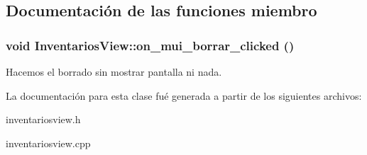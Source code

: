 \subsection{Documentaci\'{o}n de las funciones miembro}
\subsubsection{\setlength{\rightskip}{0pt plus 5cm}void Inventarios\-View::on\_\-mui\_\-borrar\_\-clicked ()\hspace{0.3cm}{\tt  [virtual, slot]}}\label{classInventariosView_i0}


Hacemos el borrado sin mostrar pantalla ni nada. 

La documentaci\'{o}n para esta clase fu\'{e} generada a partir de los siguientes archivos:\begin{CompactItemize}
\item 
inventariosview.h\item 
inventariosview.cpp\end{CompactItemize}
